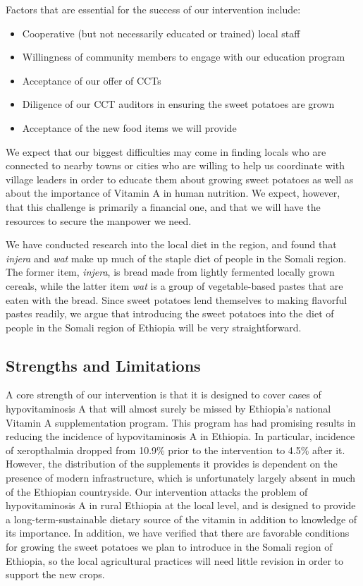 \documentclass[12pt, letterpaper, draft]{article}
\begin{document}
Factors that are essential for the success of our intervention include: 
{\begin{itemize}
\setlength\itemsep{-1em}
\item Cooperative (but not necessarily educated or trained) local staff
\item Willingness of community members to engage with our education program
\item Acceptance of our offer of CCTs
\item Diligence of our CCT auditors in ensuring the sweet potatoes are grown
\item Acceptance of the new food items we will provide
\end{itemize}}

We expect that our biggest difficulties may come in finding locals who are connected to nearby towns or cities who are willing to help us coordinate with village leaders in order to educate them about growing sweet potatoes as well as about the importance of Vitamin A in human nutrition. We expect, however, that this challenge is primarily a financial one, and that we will have the resources to secure the manpower we need.

We have conducted research into the local diet in the region, and found that \emph{injera} and \emph{wat} make up much of the staple diet of people in the Somali region. The former item, \emph{injera}, is bread made from lightly fermented locally grown cereals, while the latter item \emph{wat} is a group of vegetable-based pastes that are eaten with the bread. Since sweet potatoes lend themselves to making flavorful pastes readily, we argue that introducing the sweet potatoes into the diet of people in the Somali region of Ethiopia will be very straightforward.




\subsection{Strengths and Limitations}

A core strength of our intervention is that it is designed to cover cases of hypovitaminosis A that will almost surely be missed by Ethiopia's national Vitamin A supplementation program. This program has had promising results in reducing the incidence of hypovitaminosis A in Ethiopia. In particular, incidence of xeropthalmia dropped from 10.9\% prior to the intervention to 4.5\% \cite{demissie2007process} after it. However, the distribution of the supplements it provides is dependent on the presence of modern infrastructure, which is unfortunately largely absent in much of the Ethiopian countryside. Our intervention attacks the problem of hypovitaminosis A in rural Ethiopia at the local level, and is designed to provide a long-term-sustainable dietary source of the vitamin in addition to knowledge of its importance. In addition, we have verified that there are favorable conditions for growing the sweet potatoes we plan to introduce in the Somali region of Ethiopia, so the local agricultural practices will need little revision in order to support the new crops.   
\end{document}
